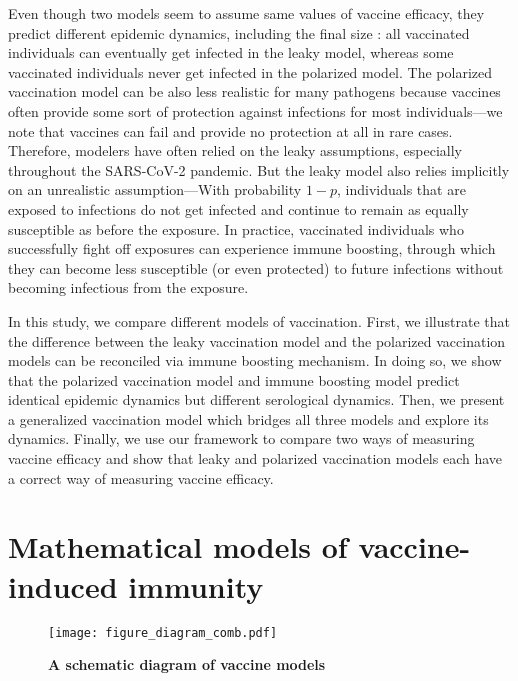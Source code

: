 \documentclass[12pt]{article}
\begin{document}
Even though two models seem to assume same values of vaccine efficacy, they predict different epidemic dynamics, including the final size \citep{smith1984assessment}:
all vaccinated individuals can eventually get infected in the leaky model, whereas some vaccinated individuals never get infected in the polarized model.
The polarized vaccination model can be also less realistic for many pathogens because vaccines often provide some sort of protection against infections for most individuals---we note that vaccines can fail and provide no protection at all in rare cases.
Therefore, modelers have often relied on the leaky assumptions, especially throughout the SARS-CoV-2 pandemic.
But the leaky model also relies implicitly on an unrealistic assumption---With probability $1-p$, individuals that are exposed to infections do not get infected and continue to remain as equally susceptible as before the exposure.
In practice, vaccinated individuals who successfully fight off exposures can experience immune boosting, through which they can become less susceptible (or even protected) to future infections without becoming infectious from the exposure.

In this study, we compare different models of vaccination.
First, we illustrate that the difference between the leaky vaccination model and the polarized vaccination models can be reconciled via immune boosting mechanism.
In doing so, we show that the polarized vaccination model and immune boosting model predict identical epidemic dynamics but different serological dynamics.
Then, we present a generalized vaccination model which bridges all three models and explore its dynamics.
Finally, we use our framework to compare two ways of measuring vaccine efficacy and show that leaky and polarized vaccination models each have a correct way of measuring vaccine efficacy.

\section*{Mathematical models of vaccine-induced immunity}

\begin{figure}[!th]
\texttt{[image: figure\_diagram\_comb.pdf]}
\caption{
\textbf{A schematic diagram of vaccine models}
\label{fig:diagram}
}
\end{figure}
\end{document}
